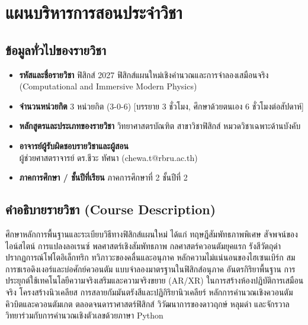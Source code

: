 \chapter*{แผนบริหารการสอนประจำวิชา}

\section*{ข้อมูลทั่วไปของรายวิชา}
\begin{itemize}[leftmargin=1.5em]
    \item \textbf{รหัสและชื่อรายวิชา} ฟิสิกส์ 2027 ฟิสิกส์แผนใหม่เชิงคำนวณและการจำลองเสมือนจริง (Computational and Immersive Modern Physics)
    \item \textbf{จำนวนหน่วยกิต} 3 หน่วยกิต (3-0-6) [บรรยาย 3 ชั่วโมง, ศึกษาด้วยตนเอง 6 ชั่วโมงต่อสัปดาห์]
    \item \textbf{หลักสูตรและประเภทของรายวิชา} วิทยาศาสตรบัณฑิต สาขาวิชาฟิสิกส์ หมวดวิชาเฉพาะด้านบังคับ
    \item \textbf{อาจารย์ผู้รับผิดชอบรายวิชาและผู้สอน} \\
    ผู้ช่วยศาสตราจารย์ ดร.ชีวะ ทัศนา (chewa.t@rbru.ac.th)
    \item \textbf{ภาคการศึกษา / ชั้นปีที่เรียน} ภาคการศึกษาที่ 2 ชั้นปีที่ 2
\end{itemize}

\section*{คำอธิบายรายวิชา (Course Description)}
ศึกษาหลักการพื้นฐานและระเบียบวิธีทางฟิสิกส์แผนใหม่ ได้แก่ ทฤษฎีสัมพัทธภาพพิเศษ สัจพจน์ของไอน์สไตน์ การแปลงลอเรนซ์ พลศาสตร์เชิงสัมพัทธภาพ กลศาสตร์ควอนตัมยุคแรก รังสีวัตถุดำ ปรากฏการณ์โฟโตอิเล็กทริก ทวิภาวะของคลื่นและอนุภาค หลักความไม่แน่นอนของไฮเซนเบิร์ก สมการชเรอดิงเงอร์และบ่อศักย์ควอนตัม แบบจำลองมาตรฐานในฟิสิกส์อนุภาค อันตรกิริยาพื้นฐาน การประยุกต์ใช้เทคโนโลยีความจริงเสริมและความจริงขยาย (AR/XR) ในการสร้างห้องปฏิบัติการเสมือนจริง โครงสร้างนิวเคลียส การสลายกัมมันตรังสีและปฏิกิริยานิวเคลียร์ หลักการคำนวณเชิงควอนตัม คิวบิตและควอนตัมเกต ตลอดจนดาราศาสตร์ฟิสิกส์ วิวัฒนาการของดาวฤกษ์ หลุมดำ และจักรวาลวิทยาร่วมกับการคำนวณเชิงตัวเลขด้วยภาษา Python

